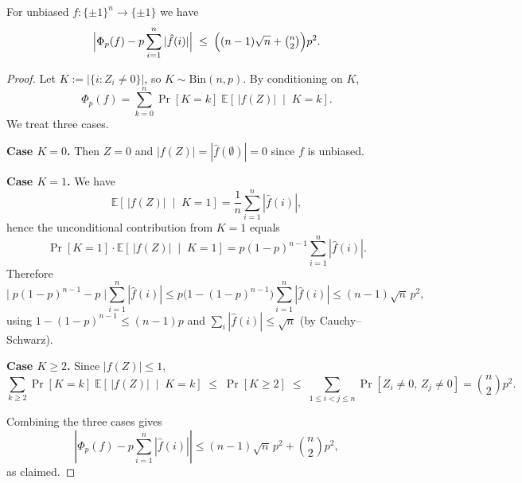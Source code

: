 \documentclass[10pt,a4paper]{amsart}
\begin{document}
\begin{lemma}\label{lemma1}
For unbiased $f:\{\pm1\}^n\to\{\pm1\}$ we have
\[
\Bigl|\Phi_p(f)-p\sum_{i=1}^n|\hat f(i)|\Bigr|
\;\le\; \Bigl((n-1)\sqrt n+\tbinom{n}{2}\Bigr)p^2.
\]
\end{lemma}

\begin{proof}
Let $K:=|\{i:Z_i\neq 0\}|$, so $K\sim\mathrm{Bin}(n,p)$. By conditioning on $K$,
\[
\Phi_p(f)=\sum_{k=0}^n \Pr[K=k]\;\mathbb E\!\left[\,|f(Z)|\;\middle|\;K=k\right].
\]
We treat three cases.

\medskip
\noindent\textbf{Case \(K=0\).} Then $Z=0$ and $|f(Z)|=|\hat f(\emptyset)|=0$ since $f$ is unbiased.

\medskip
\noindent\textbf{Case \(K=1\).} We have
\[
\mathbb E\!\left[\,|f(Z)|\;\middle|\;K=1\right]
=\frac{1}{n}\sum_{i=1}^n |\hat f(i)|,
\]
hence the unconditional contribution from $K=1$ equals
\[
\Pr[K=1]\cdot \mathbb E\!\left[\,|f(Z)|\;\middle|\;K=1\right]
= p(1-p)^{n-1}\sum_{i=1}^n |\hat f(i)|.
\]
Therefore
\[
\bigl|\;p(1-p)^{n-1}-p\;\bigr|\sum_{i=1}^n|\hat f(i)|
\le p\bigl(1-(1-p)^{n-1}\bigr)\sum_{i=1}^n|\hat f(i)|
\le (n-1)\sqrt{n}\,p^2,
\]
using $1-(1-p)^{n-1}\le (n-1)p$ and $\sum_i|\hat f(i)|\le \sqrt n$ (by Cauchy--Schwarz).

\medskip
\noindent\textbf{Case \(K\ge2\).} Since $|f(Z)|\le 1$,
\[
\sum_{k\ge2}\Pr[K=k]\;\mathbb E\!\left[\,|f(Z)|\;\middle|\;K=k\right]
\;\le\;\Pr[K\ge2]
\;\le\; \sum_{1\le i<j\le n}\Pr[Z_i\neq 0,\,Z_j\neq 0]
=\binom{n}{2}p^2.
\]

\medskip
Combining the three cases gives
\[
\left|\Phi_p(f)-p\sum_{i=1}^n|\hat f(i)|\right|
\le (n-1)\sqrt n\,p^2+\binom{n}{2}p^2,
\]
as claimed.
\end{proof}
\end{document}
